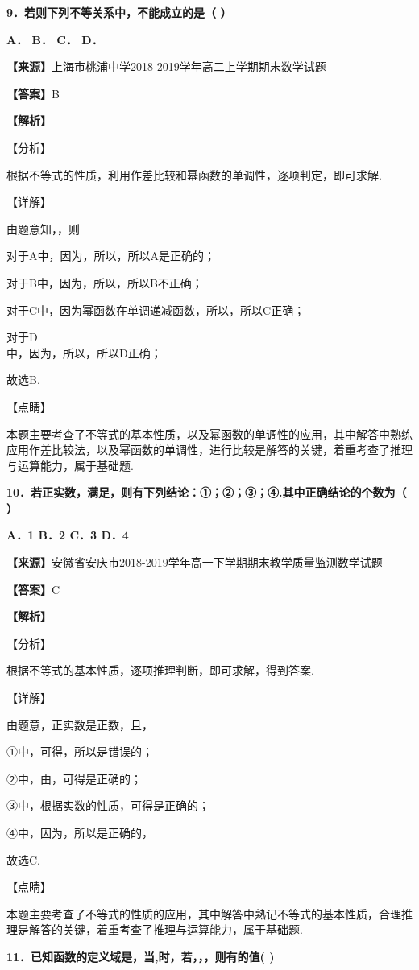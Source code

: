 \documentclass[
]{article}
\begin{document}
\textbf{9．若则下列不等关系中，不能成立的是（ ）}

\textbf{A． B． C． D．}

\textbf{【来源】}上海市桃浦中学2018-2019学年高二上学期期末数学试题

\textbf{【答案】}B

\textbf{【解析】}

【分析】

根据不等式的性质，利用作差比较和幂函数的单调性，逐项判定，即可求解.

【详解】

由题意知，，则

对于A中，因为，所以，所以A是正确的；

对于B中，因为，所以，所以B不正确；

对于C中，因为幂函数在单调递减函数，所以，所以C正确；

对于D\\
中，因为，所以，所以D正确；

故选B.

【点睛】

本题主要考查了不等式的基本性质，以及幂函数的单调性的应用，其中解答中熟练应用作差比较法，以及幂函数的单调性，进行比较是解答的关键，着重考查了推理与运算能力，属于基础题.

\textbf{10．若正实数，满足，则有下列结论：①；②；③；④.其中正确结论的个数为（
）}

\textbf{A．1 B．2 C．3 D．4}

\textbf{【来源】}安徽省安庆市2018-2019学年高一下学期期末教学质量监测数学试题

\textbf{【答案】}C

\textbf{【解析】}

【分析】

根据不等式的基本性质，逐项推理判断，即可求解，得到答案.

【详解】

由题意，正实数是正数，且，

①中，可得，所以是错误的；

②中，由，可得是正确的；

③中，根据实数的性质，可得是正确的；

④中，因为，所以是正确的，

故选C.

【点睛】

本题主要考查了不等式的性质的应用，其中解答中熟记不等式的基本性质，合理推理是解答的关键，着重考查了推理与运算能力，属于基础题.

\textbf{11．已知函数的定义域是，当,时，若，，，则有的值( )}
\end{document}

